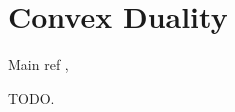 
\chapter{Convex Duality}

Main ref \cite{chambolle2010introduction,chambolle2016introduction,boyd2004convex}, \cite{parikh2014proximal,boyd2011distributed,beck2014introduction}

TODO.




